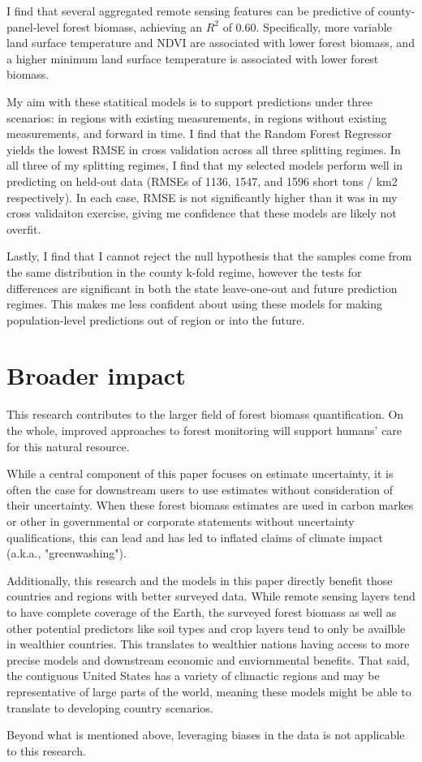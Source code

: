 \documentclass{article}
\begin{document}
I find that several aggregated remote sensing features can be predictive of county-panel-level forest biomass, achieving an $R^2$ of 0.60. Specifically, more variable land surface temperature and NDVI are associated with lower forest biomass, and a higher minimum land surface temperature is associated with lower forest biomass.

My aim with these statitical models is to support predictions under three scenarios: in regions with existing measurements, in regions without existing measurements, and forward in time. I find that the Random Forest Regressor yields the lowest RMSE in cross validation across all three splitting regimes. In all three of my splitting regimes, I find that my selected models perform well in predicting on held-out data (RMSEs of 1136, 1547, and 1596 short tons / km2 respectively). In each case, RMSE is not significantly higher than it was in my cross validaiton exercise, giving me confidence that these models are likely not overfit. 

Lastly, I find that I cannot reject the null hypothesis that the samples come from the same distribution in the county k-fold regime, however the tests for differences are significant in both the state leave-one-out and future prediction regimes. This makes me less confident about using these models for making population-level predictions out of region or into the future.

\section*{Broader impact}

This research contributes to the larger field of forest biomass quantification. On the whole, improved approaches to forest monitoring will support humans' care for this natural resource. 

While a central component of this paper focuses on estimate uncertainty, it is often the case for downstream users to use estimates without consideration of their uncertainty. When these forest biomass estimates are used in carbon markes or other in governmental or corporate statements without uncertainty qualifications, this can lead and has led to inflated claims of climate impact (a.k.a., "greenwashing").

Additionally, this research and the models in this paper directly benefit those countries and regions with better surveyed data. While remote sensing layers tend to have complete coverage of the Earth, the surveyed forest biomass as well as other potential predictors like soil types and crop layers tend to only be availble in wealthier countries. This translates to wealthier nations having access to more precise models and downstream economic and enviornmental benefits. That said, the contiguous United States has a variety of climactic regions and may be representative of large parts of the world, meaning these models might be able to translate to developing country scenarios. 

Beyond what is mentioned above, leveraging biases in the data is not applicable to this research. 

{\small


}
\end{document}
